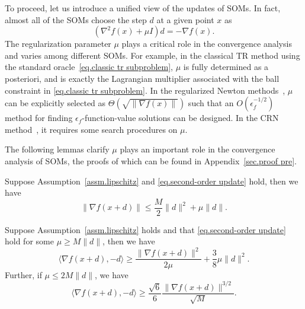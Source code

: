 \documentclass[moor,sglanonrev]{informs4}
\begin{document}
To proceed, let us introduce a unified view of the updates of SOMs. In fact, almost all of the SOMs choose the step $d$ at a given point $x$ as
\begin{equation}
    \label{eq.second-order update}
    (\nabla^2 f(x) + \mu I )d = -\nabla f(x).
\end{equation}
The regularization parameter $\mu$ plays a critical role in the convergence analysis and varies among different SOMs. For example, in the classical TR method using the standard oracle~\eqref{eq.classic tr subproblem}, $\mu$ is fully determined as a posteriori, and is exactly the Lagrangian multiplier associated with the ball constraint in \eqref{eq.classic tr subproblem}. In the regularized Newton methods~\cite{mishchenko2023regularized}, $\mu$ can be explicitly selected as $\Theta(\sqrt{\|\nabla f(x)\|})$ such that an $O(\epsilon_f^{-1/2})$ method for finding $\epsilon_f$-function-value solutions can be designed. In the CRN method~\cite{nesterov2006cubic}, it requires some search procedures on $\mu$.

The following lemmas clarify $\mu$ plays an important role in the convergence analysis of SOMs, the proofs of which can be found in Appendix~\ref{sec.proof pre}.
\begin{lemma}
    \label{lem.bound next gradient}
    Suppose Assumption~\ref{assm.lipschitz} and \eqref{eq.second-order update} hold, then we have
    \begin{equation}
        \label{eq.bound next gradient}
        \|\nabla f(x+d)\| \leq \frac{M}{2}\|d\|^2+\mu\|d\|.
    \end{equation}
\end{lemma}

\begin{lemma}
    \label{lem.inner product g and d}
    Suppose Assumption~\ref{assm.lipschitz} holds and that \eqref{eq.second-order update} hold for some $\mu\geq M\|d\|$, then we have
    \begin{equation}
        \label{eq.inner product g d}
        \langle \nabla f(x+d),-d \rangle \geq \frac{\|\nabla f(x+d)\|^2}{2\mu}+\frac{3}{8}\mu \|d\|^2.
    \end{equation}
    Further, if $\mu \leq 2M\|d\|$, we have
    \begin{equation}
        \label{eq.inner product g d advanced}
        \langle \nabla f(x+d),-d \rangle \geq \frac{\sqrt{6}}{6} \frac{\|\nabla f(x+d)\|^{3/2}}{\sqrt{M}}.
    \end{equation}
\end{lemma}
\end{document}
